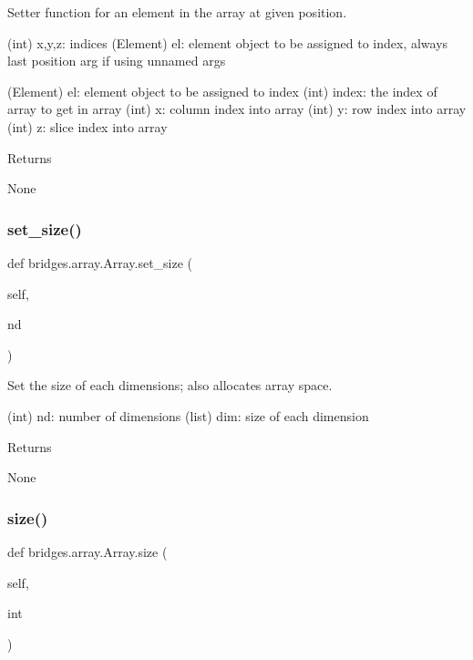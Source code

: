 Setter function for an element in the array at given position. 

(int) x,y,z\+: indices (Element) el\+: element object to be assigned to index, always last position arg if using unnamed args

(Element) el\+: element object to be assigned to index (int) index\+: the index of array to get in array (int) x\+: column index into array (int) y\+: row index into array (int) z\+: slice index into array \begin{DoxyReturn}{Returns}


None 
\end{DoxyReturn}
\mbox{\label{classbridges_1_1array_1_1_array_a0f1ede3d78cfafe1202d28520096272e}} 
\subsubsection{\texorpdfstring{set\+\_\+size()}{set\_size()}}
{\footnotesize\ttfamily def bridges.\+array.\+Array.\+set\+\_\+size (\begin{DoxyParamCaption}\item[{}]{self,  }\item[{}]{nd }\end{DoxyParamCaption})}



Set the size of each dimensions; also allocates array space. 

(int) nd\+: number of dimensions (list) dim\+: size of each dimension \begin{DoxyReturn}{Returns}


None 
\end{DoxyReturn}
\mbox{\label{classbridges_1_1array_1_1_array_a01292e2099a89d0927855c25aedc8662}} 
\subsubsection{\texorpdfstring{size()}{size()}\hspace{0.1cm}{\footnotesize\ttfamily [1/2]}}
{\footnotesize\ttfamily def bridges.\+array.\+Array.\+size (\begin{DoxyParamCaption}\item[{}]{self,  }\item[{}]{int }\end{DoxyParamCaption})}




